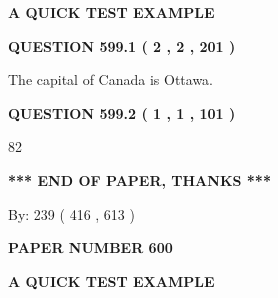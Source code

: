 \documentclass[12pt]{article}
\begin{document}
   
   
   
 \vspace{0.2in}
{\LARGE {\textbf{ A QUICK TEST EXAMPLE}}}
   
   
  
\vspace{0.2in}
  
{\textbf{\Large{QUESTION
599.1 
 ( 2 , 2 , 201 )
}}}
  
  
 
 
\noindent{}
 
 
The capital of Canada is Ottawa.
 
 
 
 
  
\vspace{0.2in}
  
{\textbf{\Large{QUESTION
599.2 
 ( 1 , 1 , 101 )
}}}
  
  
 
 
\noindent{}

82
 
 
   
   
 \vspace{0.2in}
 
   
   
   
   
\vspace{1.0in} 
{\textbf{\large{ *** END OF PAPER, THANKS *** }}} 
   
   
\hspace{1.0in} By: 
 239 ( 416 ,  613 )
   
   
   
   
\newpage 
\setcounter{page}{ 
   600001 } 
   
   
   
   
 {\textbf{ \Large{ PAPER NUMBER  600  }}}
   
   
\vspace{0.2in}
   
   
   
   
   
   
 \vspace{0.2in}
{\LARGE {\textbf{ A QUICK TEST EXAMPLE}}}
   
   
  
\vspace{0.2in}
  
\end{document}
